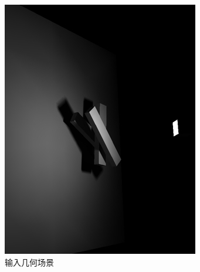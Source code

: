 \begin{figure}
\begin{fullwidth}
	\begin{subfigure}[b]{0.245\thewidth}
		\includegraphics[width=1.\textwidth]{figures/r/hierarchical-triangulation-1}
		\caption{输入几何场景}
	\end{subfigure}
	\begin{subfigure}[b]{0.245\thewidth}

\end{subfigure}
\end{fullwidth}
\end{figure}
